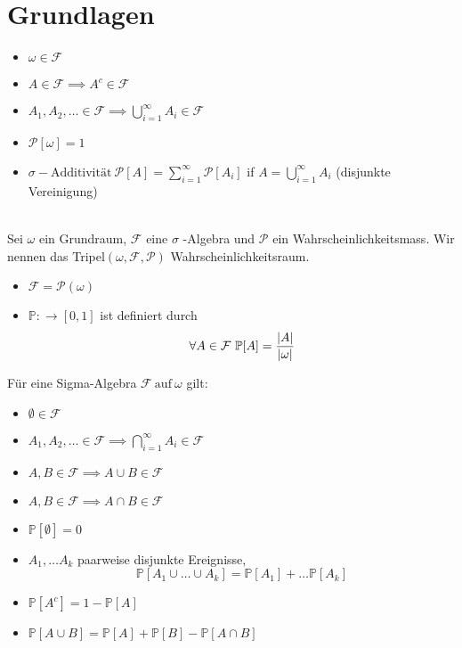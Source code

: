 \section*{Grundlagen}
\begin{itemize}
    \item \(\omega \in \mathcal{F}\)
    \item  \(A \in \mathcal{F} \implies A^c \in \mathcal{F}\)
    \item \(A_1, A_2, \dots \in \mathcal{F} \implies \bigcup_{i=1}^{\infty} A_i \in \mathcal{F} \)
\end{itemize}
\Def[1.2 Wahrscheinlichkeitsmass ]
\begin{itemize}
    \item \( \mathcal{P}[\omega] = 1\)
    \item \(\sigma-\text{Additivität} \ \mathcal{P}[A] = \sum_{i=1}^{\infty} \mathcal{P}[A_i]\) \newline if \( A = \bigcup_{i=1}^{\infty} A_i \) (disjunkte Vereinigung)
\end{itemize}
\Def[1.3 Wahrscheinlichkeitsraum ] \\
Sei \( \omega \) ein Grundraum, \(\mathcal{F}\) eine \(\sigma\) -Algebra und \(\mathcal{P}\) ein Wahrscheinlichkeitsmass. Wir nennen das Tripel\( (\omega, \mathcal{F}, \mathcal{P})\)  Wahrscheinlichkeitsraum.
 \\
\begin{itemize}
    \item \(\mathcal{F} = \mathcal{P}(\omega)\)
    \item \(\mathbb{P} : \rightarrow \left[0,1\right]\) ist definiert durch \[ \forall A \in \mathcal{F} \ \mathbb{P}[A] = \frac{\left\lvert A \right\rvert}{\left\lvert \omega \right\rvert}\]
\end{itemize}
\Satz[1.6]
Für eine Sigma-Algebra \(\mathcal{F} \ \text{auf} \ \omega\) gilt:
\begin{itemize}
    \item \(\emptyset \in \mathcal{F}\)
    \item \(A_1, A_2, \dots \in \mathcal{F} \implies \bigcap_{i=1}^{\infty} A_i \in \mathcal{F}\)
    \item \(A,B \in \mathcal{F} \implies A \cup B \in \mathcal{F}\)
    \item \(A,B \in \mathcal{F} \implies A \cap B \in \mathcal{F}\)
\end{itemize}
\Satz[1.7]
\begin{itemize}
    \item \( \mathbb{P}[\emptyset] = 0\)
    \item \(A_1, \dots A_k\) paarweise disjunkte Ereignisse, \[\mathbb{P}[A_1 \cup \dots \cup A_k] = \mathbb{P}[A_1] + \dots \mathbb{P}[A_k]\]
    \item \( \mathbb{P}[A^c] = 1 - \mathbb{P}[A]\)
    \item \(\mathbb{P}[A \cup B ] = \mathbb{P}[A] + \mathbb{P}[B] - \mathbb{P}[A \cap B]\)
\end{itemize}
